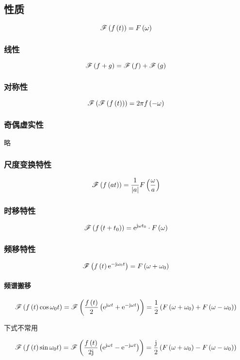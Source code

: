 \documentclass{article}
\begin{document}
\subsection{性质}

\[\fourier{\ft}=\fw\]

\subsubsection{线性}

\[\fourier{f+g}=\fourier f+\fourier g\]

\subsubsection{对称性}

\[\fourier{\fourier\ft}=2\pi f\p{-\omega}\]

\subsubsection{奇偶虚实性}

略

\subsubsection{尺度变换特性}

\[\fourier{f\p{at}}=\frac1{\abs a}F\p{\frac\omega a}\]

\subsubsection{时移特性}

\[\fourier{f\p{t+t_0}}=\e^{\j\omega t_0}\cdot \fw\]

\subsubsection{频移特性}

\[\fourier{\ft\e^{-\j\omega_0t}}=F\p{\omega+\omega_0}\]

\paragraph{频谱搬移}

\[\fourier{\ft\cos\omega_0t}
    =\fourier{\frac\ft2\p{\e^{\j\omega t}+\e^{-\j\omega t}}}
    =\frac12\p{F\p{\omega+\omega_0}+F\p{\omega-\omega_0}}\]

下式不常用

\[\fourier{\ft\sin\omega_0t}
    =\fourier{\frac\ft{2\j}\p{\e^{\j\omega t}-\e^{-\j\omega t}}}
    =\frac\j2\p{F\p{\omega+\omega_0}-F\p{\omega-\omega_0}}\]
\end{document}
